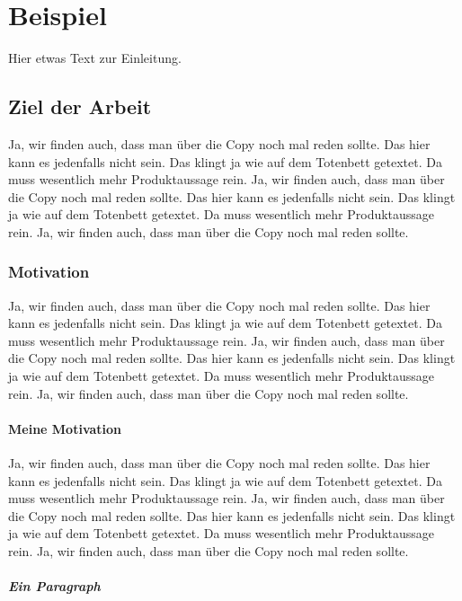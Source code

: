 

\chapter{Beispiel}

Hier etwas Text zur Einleitung.


\section{Ziel der Arbeit}

Ja, wir finden auch, dass man über die Copy noch mal reden sollte. Das hier kann es jedenfalls nicht sein. Das klingt ja wie auf dem Totenbett getextet. Da muss wesentlich mehr Produktaussage rein. Ja, wir finden auch, dass man über die Copy noch mal reden sollte. Das hier kann es jedenfalls nicht sein. Das klingt ja wie auf dem Totenbett getextet. Da muss wesentlich mehr Produktaussage rein. Ja, wir finden auch, dass man über die Copy noch mal reden sollte.


\subsection{Motivation}

Ja, wir finden auch, dass man über die Copy noch mal reden sollte. Das hier kann es jedenfalls nicht sein. Das klingt ja wie auf dem Totenbett getextet. Da muss wesentlich mehr Produktaussage rein. Ja, wir finden auch, dass man über die Copy noch mal reden sollte. Das hier kann es jedenfalls nicht sein. Das klingt ja wie auf dem Totenbett getextet. Da muss wesentlich mehr Produktaussage rein. Ja, wir finden auch, dass man über die Copy noch mal reden sollte.


\subsubsection{Meine Motivation}

Ja, wir finden auch, dass man über die Copy noch mal reden sollte. Das hier kann es jedenfalls nicht sein. Das klingt ja wie auf dem Totenbett getextet. Da muss wesentlich mehr Produktaussage rein. Ja, wir finden auch, dass man über die Copy noch mal reden sollte. Das hier kann es jedenfalls nicht sein. Das klingt ja wie auf dem Totenbett getextet. Da muss wesentlich mehr Produktaussage rein. Ja, wir finden auch, dass man über die Copy noch mal reden sollte.


\paragraph{Ein Paragraph}


